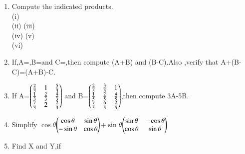\begin{enumerate}[label=\arabic*.,ref=\thesubsection.\theenumi]
\item Compute the indicated products.\\
(i) \\
(ii) (iii) \\
(iv) (v) \\
(vi) \\
\item If,A=,B=and C=,then compute (A+B) and (B-C).Also ,verify that A+(B-C)=(A+B)-C.\\
\item If A=$\begin{pmatrix}\frac{2}{3} & 1 & \frac{5}{3}\\ \frac{1}{3} & \frac{2}{3} & \frac{4}{3} \\ \frac{7}{3} &2  & \frac{2}{3}\end{pmatrix}$ and B=$\begin{pmatrix}\frac{2}{5} & \frac{3}{5} &1 \\ \frac{1}{5} & \frac{2}{5} & \frac{4}{5}\\ \frac{7}{5} & \frac{6}{5} & \frac{2}{5}\end{pmatrix}$,then compute 3A-5B.\\
\item Simplify $\cos\theta$$\begin{pmatrix}\cos\theta &\sin\theta\\ -\sin\theta &\cos\theta\end{pmatrix}$+$\sin\theta$$\begin{pmatrix}\sin\theta &-\cos\theta\\ \cos\theta &\sin\theta\end{pmatrix}$\\
\item Find X and Y,if\\

\end{enumerate}
